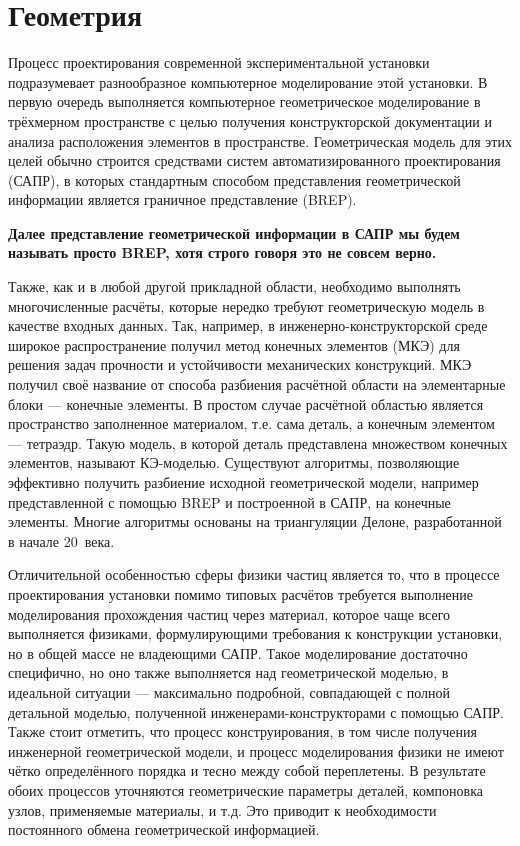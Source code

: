 \chapter{Геометрия}\label{sec:secGeometry}

Процесс проектирования современной экспериментальной установки подразумевает разнообразное компьютерное моделирование этой установки. В первую очередь выполняется компьютерное геометрическое моделирование в трёхмерном пространстве с целью получения конструкторской документации и анализа расположения элементов в пространстве. Геометрическая модель для этих целей обычно строится средствами систем автоматизированного проектирования (САПР), в которых стандартным способом представления геометрической информации является граничное представление (BREP).

\textbf{Далее представление геометрической информации в САПР мы будем называть просто BREP, хотя строго говоря это не совсем верно.}

Также, как и в любой другой прикладной области, необходимо выполнять многочисленные расчёты, которые нередко требуют геометрическую модель в качестве входных данных. Так, например, в инженерно-конструкторской среде широкое распространение получил метод конечных элементов (МКЭ) для решения задач прочности и устойчивости механических конструкций. МКЭ получил своё название от способа разбиения расчётной области на элементарные блоки --- конечные элементы. В простом случае расчётной областью является пространство заполненное материалом, т.е. сама деталь, а конечным элементом --- тетраэдр. Такую модель, в которой деталь представлена множеством конечных элементов, называют КЭ-моделью. Существуют алгоритмы, позволяющие эффективно получить разбиение исходной геометрической модели, например представленной с помощью BREP и построенной в САПР, на конечные элементы. Многие алгоритмы основаны на триангуляции Делоне, разработанной в начале 20~века.

Отличительной особенностью сферы физики частиц является то, что в процессе проектирования установки помимо типовых расчётов требуется выполнение моделирования прохождения частиц через материал, которое чаще всего выполняется физиками, формулирующими требования к конструкции установки, но в общей массе не владеющими САПР. Такое моделирование достаточно специфично, но оно также выполняется над геометрической моделью, в идеальной ситуации --- максимально подробной, совпадающей с полной детальной моделью, полученной инженерами-конструкторами с помощью САПР. Также стоит отметить, что процесс конструирования, в том числе получения инженерной геометрической модели, и процесс моделирования физики не имеют чётко определённого порядка и тесно между собой переплетены. В результате обоих процессов уточняются геометрические параметры деталей, компоновка узлов, применяемые материалы, и т.д. Это приводит к необходимости постоянного обмена геометрической информацией.

